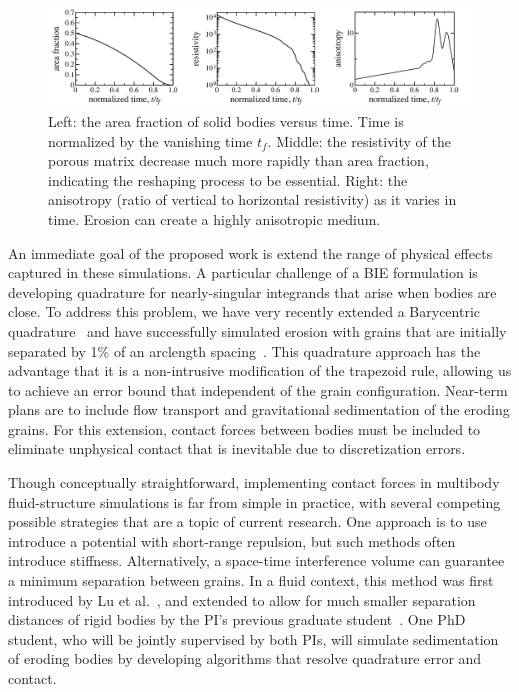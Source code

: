 \documentclass[11pt]{article}
\begin{document}
\begin{figure}%
\begin{center}
\includegraphics[width = 0.99 \textwidth]{./figs/fig3.pdf}
\caption{\label{fig3} Left: the area fraction of solid bodies versus time. Time is normalized by the vanishing time $t_f$. Middle: the resistivity of the porous matrix decrease much more rapidly than area fraction, indicating the reshaping process to be essential. Right: the anisotropy (ratio of vertical to horizontal resistivity) as it varies in time. Erosion can create a highly anisotropic medium.
}
\end{center}
\end{figure}


An immediate goal of the proposed work is extend the range of physical effects captured in these simulations. A particular challenge of a BIE formulation is developing quadrature for nearly-singular integrands that arise when bodies are close. To address this problem, we have very recently extended a Barycentric quadrature~\cite{bar2014, bar-wu-vee2015} and have successfully simulated erosion with grains that are initially separated by 1\% of an arclength spacing~\cite{chi-moo-qua2019}. This quadrature approach has the advantage that it is a non-intrusive modification of the trapezoid rule, allowing us to achieve an error bound that independent of the grain configuration. Near-term plans are to include flow transport and gravitational sedimentation of the eroding grains. For this extension, contact forces between bodies must be included to eliminate unphysical contact that is inevitable due to discretization errors. 

Though conceptually straightforward, implementing contact forces in multibody fluid-structure simulations is far from simple in practice, with several competing possible strategies that are a topic of current research.  One approach is to use introduce a potential with short-range repulsion, but such methods often introduce stiffness. Alternatively, a space-time interference volume can guarantee a minimum separation between grains.  In a fluid context, this method was first introduced by Lu et al.~\cite{lu-rah-zor2017}, and extended to allow for much smaller separation distances of rigid bodies by the PI's previous graduate student~\cite{bys-sha-qua2019}. One PhD student, who will be jointly supervised by both PIs, will simulate sedimentation of eroding bodies by developing algorithms that resolve quadrature error and contact.
\end{document}
